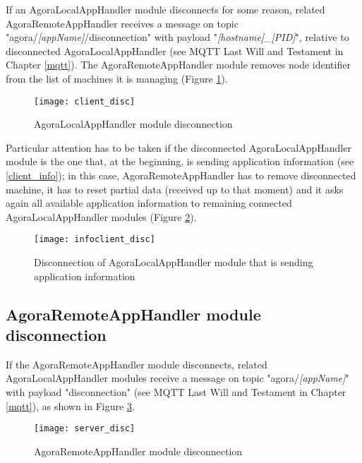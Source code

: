 If an AgoraLocalAppHandler module disconnects for some reason, related Agora\-Remote\-App\-Handler receives a message on topic "agora\slash{}\textit{[appName]}\slash{}dis\-con\-nec\-tion" with payload "\textit{[hostname]\_[PID]}", relative to disconnected AgoraLocalAppHandler (see MQTT Last Will and Testament in Chapter \ref{mqtt}). The AgoraRemote\-App\-Handler module removes node identifier from the list of machines it is managing (Figure \ref{fig::locDisc}).

\begin{figure}[ht]

    \centering
    \texttt{[image: client\_disc]}
    \caption{AgoraLocalAppHandler module disconnection}

    \label{fig::locDisc}
    
\end{figure}

Particular attention has to be taken if the disconnected AgoraLocalAppHandler module is the one that, at the beginning, is sending application information (see \ref{client_info}); in this case, AgoraRemoteAppHandler has to remove disconnected machine, it has to reset partial data (received up to that moment) and it asks again all available application information to remaining connected Agora\-Local\-App\-Handler modules (Figure \ref{fig::locInfoDisc}).

\begin{figure}[t]

    \centering
    \texttt{[image: infoclient\_disc]}
    \caption{Disconnection of AgoraLocalAppHandler module that is sending application information}

    \label{fig::locInfoDisc}
    
\end{figure}





\subsection{AgoraRemoteAppHandler module disconnection}\label{handler_disc}

If the AgoraRemoteAppHandler module disconnects, related Agora\-Local\-App\-Handler modules receive a message on topic "agora\slash{}\textit{[appName]}" with payload "disconnection" (see MQTT Last Will and Testament in Chapter \ref{mqtt}), as shown in Figure \ref{fig::remDisc}.

\begin{figure}[htb]

    \centering
    \texttt{[image: server\_disc]}
    \caption{AgoraRemoteAppHandler module disconnection}

    \label{fig::remDisc}
    
\end{figure}

